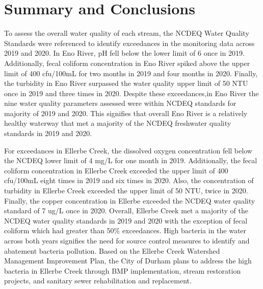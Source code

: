 \documentclass[
  12pt,
]{article}
\begin{document}
\newpage

\hypertarget{summary-and-conclusions}{%
\section{Summary and Conclusions}\label{summary-and-conclusions}}

To assess the overall water quality of each stream, the NCDEQ Water
Quality Standards were referenced to identify exceedances in the
monitoring data across 2019 and 2020. In Eno River, pH fell below the
lower limit of 6 once in 2019. Additionally, fecal coliform
concentration in Eno River spiked above the upper limit of 400 cfu/100mL
for two months in 2019 and four months in 2020. Finally, the turbidity
in Eno River surpassed the water quality upper limit of 50 NTU once in
2019 and three times in 2020. Despite these exceedances,in Eno River the
nine water quality parameters assessed were within NCDEQ standards for
majority of 2019 and 2020. This signifies that overall Eno River is a
relatively healthy waterway that met a majority of the NCDEQ freshwater
quality standards in 2019 and 2020.

For exceedances in Ellerbe Creek, the dissolved oxygen concentration
fell below the NCDEQ lower limit of 4 mg/L for one month in 2019.
Additionally, the fecal coliform concentration in Ellerbe Creek exceeded
the upper limit of 400 cfu/100mL eight times in 2019 and six times in
2020. Also, the concentration of turbidity in Ellerbe Creek exceeded the
upper limit of 50 NTU, twice in 2020. Finally, the copper concentration
in Ellerbe exceeded the NCDEQ water quality standard of 7 ug/L once in
2020. Overall, Ellerbe Creek met a majority of the NCDEQ water quality
standards in 2019 and 2020 with the exception of fecal coliform which
had greater than 50\% exceedances. High bacteria in the water across
both years signifies the need for source control measures to identify
and abatement bacteria pollution. Based on the Ellerbe Creek Watershed
Management Improvement Plan, the City of Durham plans to address the
high bacteria in Ellerbe Creek through BMP implementation, stream
restoration projects, and sanitary sewer rehabilitation and replacement.
\end{document}
